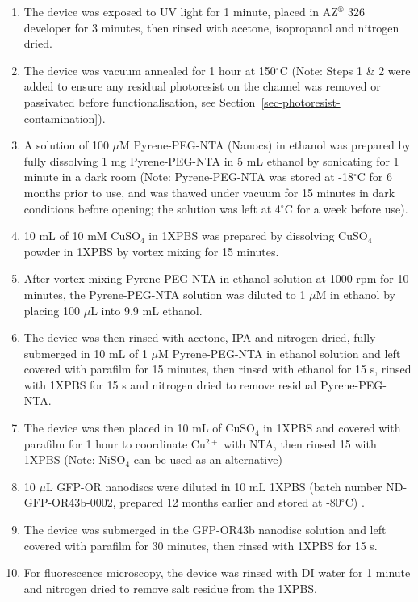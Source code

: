 \documentclass[
  a4paper,
]{scrbook}
\begin{document}
\begin{enumerate}
\def\labelenumi{\arabic{enumi}.}
\item
  The device was exposed to UV light for 1 minute, placed in
  AZ\(^\circledR\) 326 developer for 3 minutes, then rinsed with
  acetone, isopropanol and nitrogen dried.
\item
  The device was vacuum annealed for 1 hour at 150\(^\circ\)C (Note:
  Steps 1 \& 2 were added to ensure any residual photoresist on the
  channel was removed or passivated before functionalisation, see
  Section~\ref{sec-photoresist-contamination}).
\item
  A solution of 100 \(\mu\)M Pyrene-PEG-NTA (Nanocs) in ethanol was
  prepared by fully dissolving 1 mg Pyrene-PEG-NTA in 5 mL ethanol by
  sonicating for 1 minute in a dark room (Note: Pyrene-PEG-NTA was
  stored at -18\(^\circ\)C for 6 months prior to use, and was thawed
  under vacuum for 15 minutes in dark conditions before opening; the
  solution was left at 4\(^\circ\)C for a week before use).
\item
  10 mL of 10 mM CuSO\(_4\) in 1XPBS was prepared by dissolving
  CuSO\(_4\) powder in 1XPBS by vortex mixing for 15 minutes.
\item
  After vortex mixing Pyrene-PEG-NTA in ethanol solution at 1000 rpm for
  10 minutes, the Pyrene-PEG-NTA solution was diluted to 1 \(\mu\)M in
  ethanol by placing 100 \(\mu\)L into 9.9 mL ethanol.
\item
  The device was then rinsed with acetone, IPA and nitrogen dried, fully
  submerged in 10 mL of 1 \(\mu\)M Pyrene-PEG-NTA in ethanol solution
  and left covered with parafilm for 15 minutes, then rinsed with
  ethanol for 15 s, rinsed with 1XPBS for 15 s and nitrogen dried to
  remove residual Pyrene-PEG-NTA.
\item
  The device was then placed in 10 mL of CuSO\(_4\) in 1XPBS and covered
  with parafilm for 1 hour to coordinate Cu\(^{2+}\) with NTA, then
  rinsed 15 with 1XPBS (Note: NiSO\(_4\) can be used as an alternative)
\item
  10 \(\mu\)L GFP-OR nanodiscs were diluted in 10 mL 1XPBS (batch number
  ND-GFP-OR43b-0002, prepared 12 months earlier and stored at
  -80\(^\circ\)C) .
\item
  The device was submerged in the GFP-OR43b nanodisc solution and left
  covered with parafilm for 30 minutes, then rinsed with 1XPBS for 15 s.
\item
  For fluorescence microscopy, the device was rinsed with DI water for 1
  minute and nitrogen dried to remove salt residue from the 1XPBS.
\end{enumerate}
\end{document}
